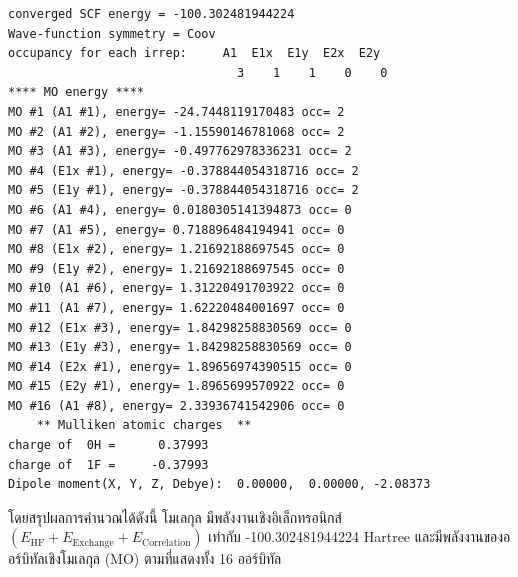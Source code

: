 \begin{lstlisting}[style=plain]
converged SCF energy = -100.302481944224
Wave-function symmetry = Coov
occupancy for each irrep:     A1  E1x  E1y  E2x  E2y
                                3    1    1    0    0
**** MO energy ****
MO #1 (A1 #1), energy= -24.7448119170483 occ= 2
MO #2 (A1 #2), energy= -1.15590146781068 occ= 2
MO #3 (A1 #3), energy= -0.497762978336231 occ= 2
MO #4 (E1x #1), energy= -0.378844054318716 occ= 2
MO #5 (E1y #1), energy= -0.378844054318716 occ= 2
MO #6 (A1 #4), energy= 0.0180305141394873 occ= 0
MO #7 (A1 #5), energy= 0.718896484194941 occ= 0
MO #8 (E1x #2), energy= 1.21692188697545 occ= 0
MO #9 (E1y #2), energy= 1.21692188697545 occ= 0
MO #10 (A1 #6), energy= 1.31220491703922 occ= 0
MO #11 (A1 #7), energy= 1.62220484001697 occ= 0
MO #12 (E1x #3), energy= 1.84298258830569 occ= 0
MO #13 (E1y #3), energy= 1.84298258830569 occ= 0
MO #14 (E2x #1), energy= 1.89656974390515 occ= 0
MO #15 (E2y #1), energy= 1.8965699570922 occ= 0
MO #16 (A1 #8), energy= 2.33936741542906 occ= 0
    ** Mulliken atomic charges  **
charge of  0H =      0.37993
charge of  1F =     -0.37993
Dipole moment(X, Y, Z, Debye):  0.00000,  0.00000, -2.08373
\end{lstlisting}

\vspace{1em}
โดยสรุปผลการคำนวณได้ดังนี้ โมเลกุล  มีพลังงานเชิงอิเล็กทรอนิกส์ $(E_{\text{HF}} + E_{\text{Exchange}} +
    E_{\text{Correlation}})$ เท่ากับ -100.302481944224 Hartree และมีพลังงานของออร์บิทัลเชิงโมเลกุล (MO) ตามที่แสดงทั้ง 16 ออร์บิทัล
